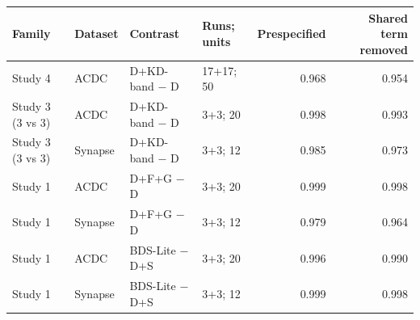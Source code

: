 \begin{tabular}{llllrr}
\toprule
Family & Dataset & Contrast & Runs; units & Prespecified & Shared term removed \\
\midrule
Study 4 & ACDC & D+KD-band $-$ D & 17+17; 50 & 0.968 & 0.954 \\
Study 3 (3 vs 3) & ACDC & D+KD-band $-$ D & 3+3; 20 & 0.998 & 0.993 \\
Study 3 (3 vs 3) & Synapse & D+KD-band $-$ D & 3+3; 12 & 0.985 & 0.973 \\
Study 1 & ACDC & D+F+G $-$ D & 3+3; 20 & 0.999 & 0.998 \\
Study 1 & Synapse & D+F+G $-$ D & 3+3; 12 & 0.979 & 0.964 \\
Study 1 & ACDC & BDS-Lite $-$ D+S & 3+3; 20 & 0.996 & 0.990 \\
Study 1 & Synapse & BDS-Lite $-$ D+S & 3+3; 12 & 0.999 & 0.998 \\
\bottomrule
\end{tabular}
